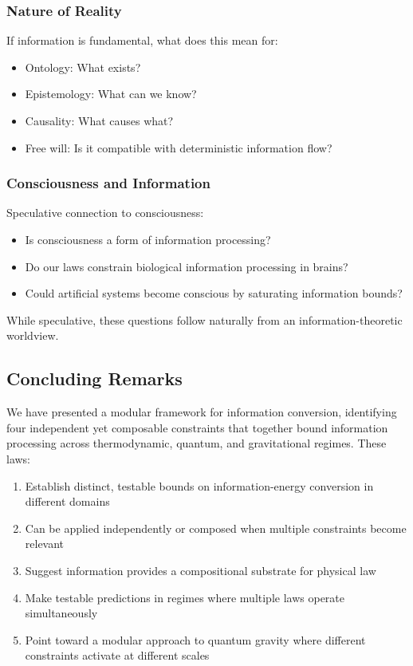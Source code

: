 \documentclass[11pt,a4paper]{article}
\theoremstyle{plain}
\theoremstyle{definition}
\theoremstyle{remark}
\begin{document}
\subsubsection{Nature of Reality}

If information is fundamental, what does this mean for:

\begin{itemize}[leftmargin=*]
\item Ontology: What exists?
\item Epistemology: What can we know?
\item Causality: What causes what?
\item Free will: Is it compatible with deterministic information flow?
\end{itemize}

\subsubsection{Consciousness and Information}

Speculative connection to consciousness:

\begin{itemize}[leftmargin=*]
\item Is consciousness a form of information processing?
\item Do our laws constrain biological information processing in brains?
\item Could artificial systems become conscious by saturating information bounds?
\end{itemize}

While speculative, these questions follow naturally from an information-theoretic worldview.

\subsection{Concluding Remarks}

We have presented a modular framework for information conversion, identifying four independent yet composable constraints that together bound information processing across thermodynamic, quantum, and gravitational regimes. These laws:

\begin{enumerate}[leftmargin=*]
\item Establish distinct, testable bounds on information-energy conversion in different domains
\item Can be applied independently or composed when multiple constraints become relevant
\item Suggest information provides a compositional substrate for physical law
\item Make testable predictions in regimes where multiple laws operate simultaneously
\item Point toward a modular approach to quantum gravity where different constraints activate at different scales
\end{enumerate}
\end{document}
